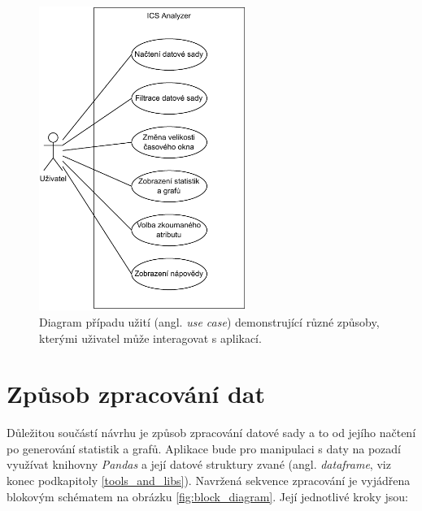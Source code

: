 \begin{figure}[H]
	\centering
	\includegraphics[width=0.6\textwidth]{obrazky-figures/use-case.pdf}
	\caption{Diagram případu užití (angl. \emph{use case}) demonstrující různé způsoby, kterými uživatel může interagovat s aplikací.}
	\label{fig:use-case}
\end{figure}



\section{Způsob zpracování dat}
\label{data_processing}


Důležitou součástí návrhu je způsob zpracování datové sady a to od jejího načtení po generování statistik a grafů. Aplikace bude pro manipulaci s daty na pozadí využívat knihovny \emph{Pandas} a její datové struktury zvané  (angl. \emph{dataframe}, viz konec podkapitoly \ref{tools_and_libs}). Navržená sekvence zpracování je vyjádřena blokovým schématem na obrázku \ref{fig:block_diagram}. Její jednotlivé kroky jsou:

